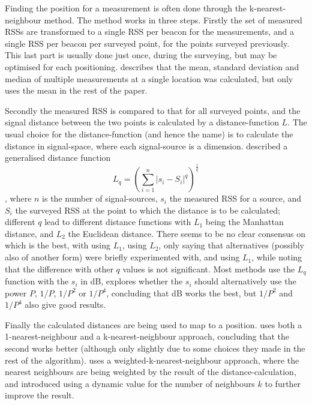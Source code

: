 Finding the position for a measurement is often done through the k-nearest-neighbour method\citet{bahl2000radar}.
The method works in three steps.
Firstly the set of measured RSSs are transformed to a single RSS per beacon for the measurements, and a single RSS per beacon per surveyed point, for the points surveyed previously.
This last part is usually done just once, during the surveying, but may be optimised for each positioning.
\citet{bahl2000radar} describes that the mean, standard deviation and median of multiple measurements at a single location was calculated, but only uses the mean in the rest of the paper.

Secondly the measured RSS is compared to that for all surveyed points, and the signal distance between the two points is calculated by a distance-function $L$.
The usual choice for the distance-function (and hence the name) is to calculate the distance in signal-space, where each signal-source is a dimension.
\citet{li2005method} described a generalised distance function
\begin{equation}
    L_q = \left(\sum_{i=1}^{n}|s_i-S_i|^q\right)^{\frac{1}{q}}
    \label{eq:architecture-distance}
\end{equation}
, where $n$ is the number of signal-sources, $s_i$ the measured RSS for a source, and $S_i$ the surveyed RSS at the point to which the distance is to be calculated; different $q$ lead to different distance functions with $L_1$ being the Manhattan distance, and $L_2$ the Euclidean distance.
There seems to be no clear consensus on which is the best, with \citet{shin2012enhanced} using $L_1$, \citet{bahl2000radar} using $L_2$, only saying that alternatives (possibly also of another form) were briefly experimented with, and \citet{li2005method} using $L_1$, while noting that the difference with other $q$ values is not significant.
Most methods use the $L_q$ function with the $s_i$ in dB, \citet{li2005method} explores whether the $s_i$ should alternatively use the power $P$, $1/P$, $1/P^2$ or $1/P^4$, concluding that dB works the best, but $1/P^2$ and $1/P^4$ also give good results.

Finally the calculated distances are being used to map to a position.
\citet{bahl2000radar} uses both a 1-nearest-neighbour and a k-nearest-neighbour approach, concluding that the second works better (although only slightly due to some choices they made in the rest of the algorithm).
\citet{li2005method} uses a weighted-k-nearest-neighbour approach, where the nearest neighbours are being weighted by the result of the distance-calculation, and \citet{shin2012enhanced} introduced using a dynamic value for the number of neighbours $k$ to further improve the result.

